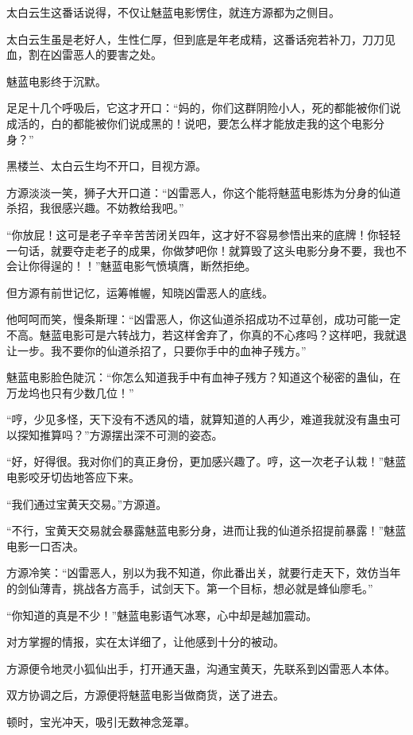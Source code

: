 \begin{this_body}
太白云生这番话说得，不仅让魅蓝电影愣住，就连方源都为之侧目。

太白云生虽是老好人，生性仁厚，但到底是年老成精，这番话宛若补刀，刀刀见血，割在凶雷恶人的要害之处。

魅蓝电影终于沉默。

足足十几个呼吸后，它这才开口：“妈的，你们这群阴险小人，死的都能被你们说成活的，白的都能被你们说成黑的！说吧，要怎么样才能放走我的这个电影分身？”

黑楼兰、太白云生均不开口，目视方源。

方源淡淡一笑，狮子大开口道：“凶雷恶人，你这个能将魅蓝电影炼为分身的仙道杀招，我很感兴趣。不妨教给我吧。”

“你放屁！这可是老子辛辛苦苦闭关四年，这才好不容易参悟出来的底牌！你轻轻一句话，就要夺走老子的成果，你做梦吧你！就算毁了这头电影分身不要，我也不会让你得逞的！！”魅蓝电影气愤填膺，断然拒绝。

但方源有前世记忆，运筹帷幄，知晓凶雷恶人的底线。

他呵呵而笑，慢条斯理：“凶雷恶人，你这仙道杀招成功不过草创，成功可能一定不高。魅蓝电影可是六转战力，若这样舍弃了，你真的不心疼吗？这样吧，我就退让一步。我不要你的仙道杀招了，只要你手中的血神子残方。”

魅蓝电影脸色陡沉：“你怎么知道我手中有血神子残方？知道这个秘密的蛊仙，在万龙坞也只有少数几位！”

“哼，少见多怪，天下没有不透风的墙，就算知道的人再少，难道我就没有蛊虫可以探知推算吗？”方源摆出深不可测的姿态。

“好，好得很。我对你们的真正身份，更加感兴趣了。哼，这一次老子认栽！”魅蓝电影咬牙切齿地答应下来。

“我们通过宝黄天交易。”方源道。

“不行，宝黄天交易就会暴露魅蓝电影分身，进而让我的仙道杀招提前暴露！”魅蓝电影一口否决。

方源冷笑：“凶雷恶人，别以为我不知道，你此番出关，就要行走天下，效仿当年的剑仙薄青，挑战各方高手，试剑天下。第一个目标，想必就是蜂仙廖毛。”

“你知道的真是不少！”魅蓝电影语气冰寒，心中却是越加震动。

对方掌握的情报，实在太详细了，让他感到十分的被动。

方源便令地灵小狐仙出手，打开通天蛊，沟通宝黄天，先联系到凶雷恶人本体。

双方协调之后，方源便将魅蓝电影当做商货，送了进去。

顿时，宝光冲天，吸引无数神念笼罩。


\end{this_body}
